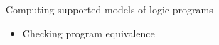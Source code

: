 \begin{frame}{Computing supported models of logic programs}
  \begin{itemize}
  \item  Checking program equivalence
    \medskip
  \end{itemize}
\end{frame}
%
